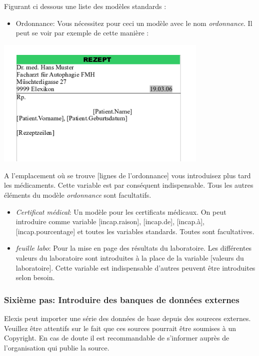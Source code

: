 Figurant ci dessous une liste des modèles standards :

\begin{itemize}
\item Ordonnance:  Vous nécessitez pour ceci un modèle avec le nom \textit{ordonnance}. Il peut se voir par exemple de cette manière :
 \end{itemize}
\includegraphics[width=4in]{images/rezept.png}

A l'emplacement où se trouve [lignes de l'ordonnance] vous introduisez plus tard les médicaments. Cette variable est par conséquent indispensable. Tous les autres éléments du modèle \textit{ordonnance} sont  facultatifs.

\begin{itemize}
 \item \textit{Certificat médical}: Un modèle pour les certificats médicaux. On peut introduire comme variable [incap.raison], [incap.de], [incap.à], [incap.pourcentage] et toutes les variables standards. Toutes sont facultatives.

 \item \textit{feuille labo}: Pour la mise en page des résultats du laboratoire. Les différentes valeurs du laboratoire sont introduites à la place de la variable [valeurs du laboratoire]. Cette variable est indispensable d'autres peuvent être introduites selon besoin.
\end{itemize}

\subsubsection{Sixième pas: Introduire des banques de données externes}

Elexis peut importer une série des données de base depuis des soureces externes. Veuillez être attentifs sur le fait que ces sources pourrait être soumises à un Copyright. En cas de doute il est recommandable de s'informer auprès de l'organisation qui publie la source.

